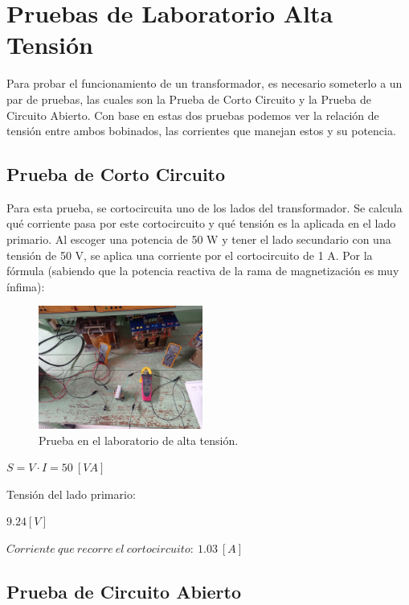 
\section*{Pruebas de Laboratorio Alta Tensión}

Para probar el funcionamiento de un transformador, es necesario someterlo a un par de pruebas, las cuales son la Prueba de Corto Circuito y la Prueba de Circuito Abierto. Con base en estas dos pruebas podemos ver la relación de tensión entre ambos bobinados, las corrientes que manejan estos y su potencia.

\subsection*{Prueba de Corto Circuito}

Para esta prueba, se cortocircuita uno de los lados del transformador. Se calcula qué corriente pasa por este cortocircuito y qué tensión es la aplicada en el lado primario. Al escoger una potencia de 50 W y tener el lado secundario con una tensión de 50 V, se aplica una corriente por el cortocircuito de 1 A. Por la fórmula (sabiendo que la potencia reactiva de la rama de magnetización es muy ínfima):
\begin{figure}[ht!]
    \centering
    \includegraphics[width=0.48\textwidth]{fot/TP1.jpeg}
    \caption{Prueba en el laboratorio de alta tensión.}
    \label{fig:TP1}
\end{figure}

\begin{center}
    $S = V \cdot I = 50\ [VA]$
\end{center}
Tensión del lado primario:
\begin{center}
    $9.24 [V]$
\end{center}

\begin{center}
    $Corriente \ que \ recorre \ el \ cortocircuito: \ 1.03\ [A]$
\end{center}

\subsection*{Prueba de Circuito Abierto}

